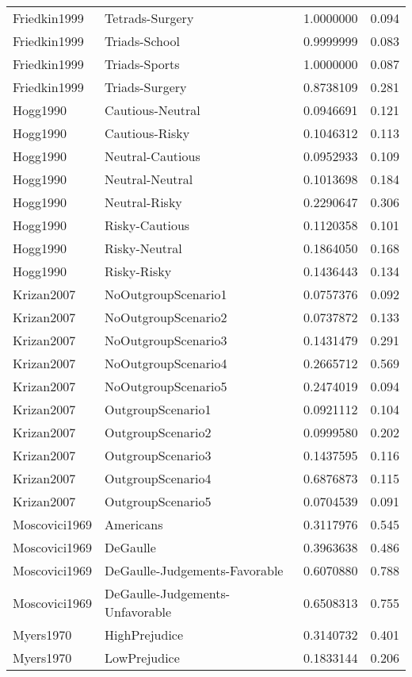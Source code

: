 \begin{longtable}{llrr}
Friedkin1999 & Tetrads-Surgery & 1.0000000 & 0.094\\
Friedkin1999 & Triads-School & 0.9999999 & 0.083\\
Friedkin1999 & Triads-Sports & 1.0000000 & 0.087\\
Friedkin1999 & Triads-Surgery & 0.8738109 & 0.281\\
\addlinespace
Hogg1990 & Cautious-Neutral & 0.0946691 & 0.121\\
Hogg1990 & Cautious-Risky & 0.1046312 & 0.113\\
Hogg1990 & Neutral-Cautious & 0.0952933 & 0.109\\
Hogg1990 & Neutral-Neutral & 0.1013698 & 0.184\\
Hogg1990 & Neutral-Risky & 0.2290647 & 0.306\\
Hogg1990 & Risky-Cautious & 0.1120358 & 0.101\\
Hogg1990 & Risky-Neutral & 0.1864050 & 0.168\\
Hogg1990 & Risky-Risky & 0.1436443 & 0.134\\
\addlinespace
Krizan2007 & NoOutgroupScenario1 & 0.0757376 & 0.092\\
Krizan2007 & NoOutgroupScenario2 & 0.0737872 & 0.133\\
Krizan2007 & NoOutgroupScenario3 & 0.1431479 & 0.291\\
Krizan2007 & NoOutgroupScenario4 & 0.2665712 & 0.569\\
Krizan2007 & NoOutgroupScenario5 & 0.2474019 & 0.094\\
Krizan2007 & OutgroupScenario1 & 0.0921112 & 0.104\\
Krizan2007 & OutgroupScenario2 & 0.0999580 & 0.202\\
Krizan2007 & OutgroupScenario3 & 0.1437595 & 0.116\\
Krizan2007 & OutgroupScenario4 & 0.6876873 & 0.115\\
Krizan2007 & OutgroupScenario5 & 0.0704539 & 0.091\\
\addlinespace
Moscovici1969 & Americans & 0.3117976 & 0.545\\
Moscovici1969 & DeGaulle & 0.3963638 & 0.486\\
Moscovici1969 & DeGaulle-Judgements-Favorable & 0.6070880 & 0.788\\
\addlinespace
Moscovici1969 & DeGaulle-Judgements-Unfavorable & 0.6508313 & 0.755\\
Myers1970 & HighPrejudice & 0.3140732 & 0.401\\
Myers1970 & LowPrejudice & 0.1833144 & 0.206\\

\end{longtable}
